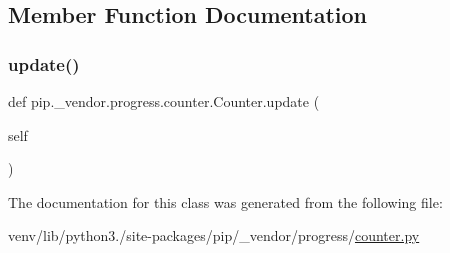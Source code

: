 \subsection{Member Function Documentation}
\mbox{\label{classpip_1_1__vendor_1_1progress_1_1counter_1_1Counter_a66bd8824561e1565e96015dbddb60366}} 
\subsubsection{\texorpdfstring{update()}{update()}}
{\footnotesize\ttfamily def pip.\+\_\+vendor.\+progress.\+counter.\+Counter.\+update (\begin{DoxyParamCaption}\item[{}]{self }\end{DoxyParamCaption})}



The documentation for this class was generated from the following file\+:\begin{DoxyCompactItemize}
\item 
venv/lib/python3./site-\/packages/pip/\+\_\+vendor/progress/\hyperlink{counter_8py}{counter.\+py}\end{DoxyCompactItemize}
